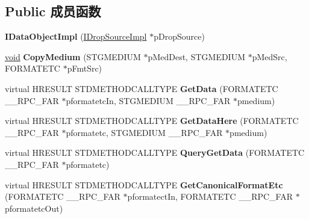 \subsection*{Public 成员函数}
\begin{DoxyCompactItemize}
\item 
\mbox{\label{class_i_data_object_impl_a8be2f9a23c97d141de06ca03fa3095ed}} 
{\bfseries I\+Data\+Object\+Impl} (\hyperlink{class_i_drop_source_impl}{I\+Drop\+Source\+Impl} $\ast$p\+Drop\+Source)
\item 
\mbox{\label{class_i_data_object_impl_a8f36923b880ab8bfe4923d2ce32487a9}} 
\hyperlink{interfacevoid}{void} {\bfseries Copy\+Medium} (S\+T\+G\+M\+E\+D\+I\+UM $\ast$p\+Med\+Dest, S\+T\+G\+M\+E\+D\+I\+UM $\ast$p\+Med\+Src, F\+O\+R\+M\+A\+T\+E\+TC $\ast$p\+Fmt\+Src)
\item 
\mbox{\label{class_i_data_object_impl_a7da9d8329cae7a9d2c3dbcf0b28883db}} 
virtual H\+R\+E\+S\+U\+LT S\+T\+D\+M\+E\+T\+H\+O\+D\+C\+A\+L\+L\+T\+Y\+PE {\bfseries Get\+Data} (F\+O\+R\+M\+A\+T\+E\+TC \+\_\+\+\_\+\+R\+P\+C\+\_\+\+F\+AR $\ast$pformatetc\+In, S\+T\+G\+M\+E\+D\+I\+UM \+\_\+\+\_\+\+R\+P\+C\+\_\+\+F\+AR $\ast$pmedium)
\item 
\mbox{\label{class_i_data_object_impl_a646f4c6fc52866372e3cb7b7f5c76777}} 
virtual H\+R\+E\+S\+U\+LT S\+T\+D\+M\+E\+T\+H\+O\+D\+C\+A\+L\+L\+T\+Y\+PE {\bfseries Get\+Data\+Here} (F\+O\+R\+M\+A\+T\+E\+TC \+\_\+\+\_\+\+R\+P\+C\+\_\+\+F\+AR $\ast$pformatetc, S\+T\+G\+M\+E\+D\+I\+UM \+\_\+\+\_\+\+R\+P\+C\+\_\+\+F\+AR $\ast$pmedium)
\item 
\mbox{\label{class_i_data_object_impl_a5e0efb13ba0ea2ca9d4805aacdcf6f0f}} 
virtual H\+R\+E\+S\+U\+LT S\+T\+D\+M\+E\+T\+H\+O\+D\+C\+A\+L\+L\+T\+Y\+PE {\bfseries Query\+Get\+Data} (F\+O\+R\+M\+A\+T\+E\+TC \+\_\+\+\_\+\+R\+P\+C\+\_\+\+F\+AR $\ast$pformatetc)
\item 
\mbox{\label{class_i_data_object_impl_a73c7a09b9540fa04071a905c8c9fe7fa}} 
virtual H\+R\+E\+S\+U\+LT S\+T\+D\+M\+E\+T\+H\+O\+D\+C\+A\+L\+L\+T\+Y\+PE {\bfseries Get\+Canonical\+Format\+Etc} (F\+O\+R\+M\+A\+T\+E\+TC \+\_\+\+\_\+\+R\+P\+C\+\_\+\+F\+AR $\ast$pformatect\+In, F\+O\+R\+M\+A\+T\+E\+TC \+\_\+\+\_\+\+R\+P\+C\+\_\+\+F\+AR $\ast$pformatetc\+Out)

\end{DoxyCompactItemize}
